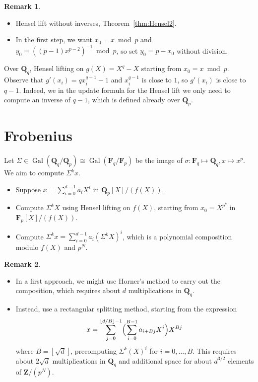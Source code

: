 \documentclass[a4paper,11pt]{article}
\theoremstyle{definition}
\newtheorem{rem}{Remark}
\DeclareMathOperator{\Gal}{Gal}
\providecommand{\floor}[1]{\left\lfloor#1\right\rfloor}%
\begin{document}
\begin{rem}
\begin{itemize}
\item Hensel lift without inverses, Theorem~\ref{thm:Hensel2}.
\item In the first step, we want $x_0 = x \bmod p$ and 
      $y_0 = ((p-1) x^{p-2})^{-1} \bmod p$, so set $y_0 = p - x_0$ 
      without division.
\end{itemize}
\end{rem}

Over $\mathbf{Q}_q$, Hensel lifting on $g(X) = X^q - X$ starting 
from $x_0 = x \bmod p$.  Observe that $g'(x_i) = q x_i^{q-1} - 1$ 
and $x_i^{q-1}$ is close to $1$, so $g'(x_i)$ is close to $q-1$. 
Indeed, we in the update formula for the Hensel lift we only need 
to compute an inverse of $q-1$, which is defined already over 
$\mathbf{Q}_p$.

\section{Frobenius}

Let $\Sigma \in \Gal(\mathbf{Q}_q/\mathbf{Q}_p) \cong \Gal(\mathbf{F}_q/\mathbf{F}_p)$ 
be the image of $\sigma \colon \mathbf{F}_q \mapsto \mathbf{Q}_q, x \mapsto x^p$. 
We aim to compute $\Sigma^k x$.

\begin{itemize}
\item Suppose $x = \sum_{i=0}^{d-1} a_i X^i$ in $\mathbf{Q}_p[X]/(f(X))$. 
\item Compute $\Sigma^k X$ using Hensel lifting on $f(X)$, starting from 
$x_0 = X^{p^k}$ in $\mathbf{F}_p[X] / (f(X))$.
\item Compute $\Sigma^k x = \sum_{i=0}^{d-1} a_i (\Sigma^k X)^i$, 
      which is a polynomial composition modulo $f(X)$ and $p^N$.
\end{itemize}

\begin{rem}
\begin{itemize}
\item In a first approach, we might use Horner's method to carry out the 
      composition, which requires about $d$ multiplications in $\mathbf{Q}_q$.
\item Instead, use a rectangular splitting method, starting from the 
      expression 
      \begin{equation}
       x = \sum_{j=0}^{\floor{d/B}-1} \Bigl( \sum_{i=0}^{B-1} a_{i+Bj} X^i  \Bigr) X^{Bj}
      \end{equation}
      where $B = \floor{\sqrt{d}}$, precomputing $\Sigma^k(X)^i$ for $i = 0, \dotsc, B$. 
      This requires about $2 \sqrt{d}$ multiplications in $\mathbf{Q}_q$ and additional 
      space for about $d^{3/2}$ elements of $\mathbf{Z}/(p^N)$.
\end{itemize}
\end{rem}
\end{document}
